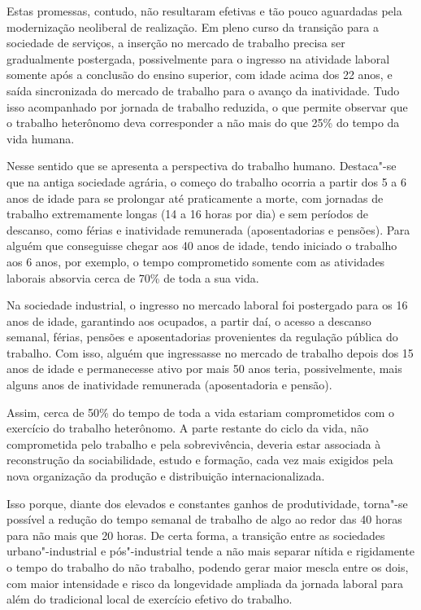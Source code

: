 Estas promessas, contudo, não resultaram efetivas e tão pouco aguardadas
pela modernização neoliberal de realização. Em pleno curso da transição
para a sociedade de serviços, a inserção no mercado de trabalho precisa
ser gradualmente postergada, possivelmente para o ingresso na atividade
laboral somente após a conclusão do ensino superior, com idade acima dos
22 anos, e saída sincronizada do mercado de trabalho para o avanço da
inatividade. Tudo isso acompanhado por jornada de trabalho reduzida, o
que permite observar que o trabalho heterônomo deva corresponder a não
mais do que 25\% do tempo da vida humana.

Nesse sentido que se apresenta a perspectiva do trabalho humano.
Destaca"-se que na antiga sociedade agrária, o começo do trabalho ocorria
a partir dos 5 a 6 anos de idade para se prolongar até praticamente a
morte, com jornadas de trabalho extremamente longas (14 a 16 horas por
dia) e sem períodos de descanso, como férias e inatividade remunerada
(aposentadorias e pensões). Para alguém que conseguisse chegar aos 40
anos de idade, tendo iniciado o trabalho aos 6 anos, por exemplo, o
tempo comprometido somente com as atividades laborais absorvia cerca de
70\% de toda a sua vida.

Na sociedade industrial, o ingresso no mercado laboral foi postergado
para os 16 anos de idade, garantindo aos ocupados, a partir daí, o
acesso a descanso semanal, férias, pensões e aposentadorias provenientes
da regulação pública do trabalho. Com isso, alguém que ingressasse no
mercado de trabalho depois dos 15 anos de idade e permanecesse ativo por
mais 50 anos teria, possivelmente, mais alguns anos de inatividade
remunerada (aposentadoria e pensão).

Assim, cerca de 50\% do tempo de toda a vida estariam comprometidos com
o exercício do trabalho heterônomo. A parte restante do ciclo da vida,
não comprometida pelo trabalho e pela sobrevivência, deveria estar
associada à reconstrução da sociabilidade, estudo e formação, cada vez
mais exigidos pela nova organização da produção e distribuição
internacionalizada.

Isso porque, diante dos elevados e constantes ganhos de produtividade,
torna"-se possível a redução do tempo semanal de trabalho de algo ao
redor das 40 horas para não mais que 20 horas. De certa forma, a
transição entre as sociedades urbano"-industrial e pós"-industrial tende a
não mais separar nítida e rigidamente o tempo do trabalho do não
trabalho, podendo gerar maior mescla entre os dois, com maior
intensidade e risco da longevidade ampliada da jornada laboral para além
do tradicional local de exercício efetivo do trabalho.

